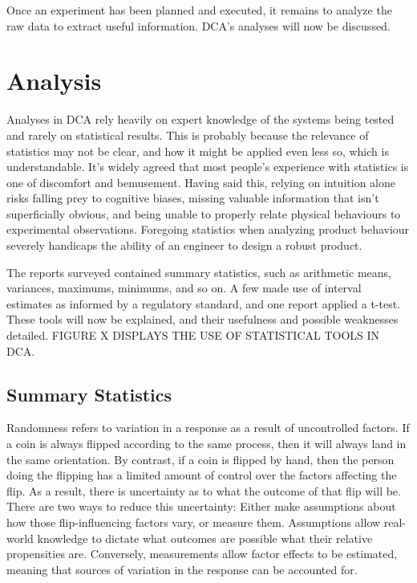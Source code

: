 \documentclass[11pt,a4paper,article]{memoir} %
\begin{document}
Once an experiment has been planned and executed, it remains to analyze the raw data to extract useful information. DCA's analyses will now be discussed.

\vspace{48pt}
\section{Analysis}
Analyses in DCA rely heavily on expert knowledge of the systems being tested and rarely on statistical results. This is probably because the relevance of statistics may not be clear, and how it might be applied even less so, which is understandable. It's widely agreed that most people's experience with statistics is one of discomfort and bemusement. Having said this, relying on intuition alone risks falling prey to cognitive biases, missing valuable information that isn't superficially obvious, and being unable to properly relate physical behaviours to experimental observations. Foregoing statistics when analyzing product behaviour severely handicaps the ability of an engineer to design a robust product.
\par
The reports surveyed contained summary statistics, such as arithmetic means, variances, maximums, minimums, and so on. A few made use of interval estimates as informed by a regulatory standard, and one report applied a t-test. These tools will now be explained, and their usefulness and possible weaknesses detailed. FIGURE X DISPLAYS THE USE OF STATISTICAL TOOLS IN DCA.
\par
\subsection*{Summary Statistics}
 Randomness refers to variation in a response as a result of uncontrolled factors. If a coin is always flipped according to the same process, then it will always land in the same orientation. By contrast, if a coin is flipped by hand, then the person doing the flipping has a limited amount of control over the factors affecting the flip. As a result, there is uncertainty as to what the outcome of that flip will be. There are two ways to reduce this uncertainty: Either make assumptions about how those flip-influencing factors vary, or measure them. Assumptions allow real-world knowledge to dictate what outcomes are possible what their relative propensities are. Conversely, measurements allow factor effects to be estimated, meaning that sources of variation in the response can be accounted for.
 
\end{document}
